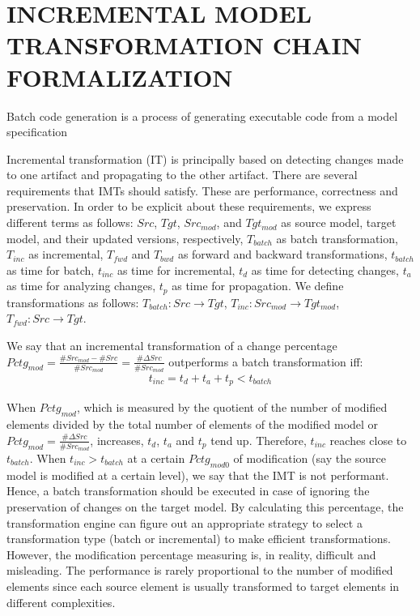 \section{\uppercase{Incremental model transformation chain formalization}}
\begin{definition}
Batch code generation is a process of generating executable code  from a model specification
\end{definition}

Incremental transformation (IT) is principally based on detecting changes made to one artifact and propagating to the other artifact. There are several requirements that IMTs should satisfy. These are performance, correctness and preservation. In order to be explicit about these requirements, we express different terms as follows: $Src$, $Tgt$, $Src_{mod}$, and $Tgt_{mod}$ as source model, target model, and their updated versions, respectively, $T_{batch}$ as batch transformation, $T_{inc}$ as incremental, $T_{fwd}$ and $T_{bwd}$ as forward and backward transformations, $t_{batch}$ as time for batch, $t_{inc}$ as time for incremental, $t_{d}$ as time for detecting changes, $t_{a}$ as time for analyzing changes, $t_{p}$ as time for propagation. We define transformations as follows: $T_{batch}: Src \rightarrow Tgt$, $T_{inc}: Src_{mod} \rightarrow Tgt_{mod}$, $T_{fwd}: Src \rightarrow Tgt$. 

We say that an incremental transformation of a change percentage $Pctg_{mod} = \frac{\# Src_{mod}-\# Src}{\# Src_{mod}} = \frac{\# \Delta Src}{\# Src_{mod}}$ outperforms a batch transformation iff:
\begin{align*}
t_{inc} = t_{d} + t_{a} + t_{p} < t_{batch}
\end{align*} 

When $Pctg_{mod}$, which is measured by the quotient of the number of modified elements divided by the total number of elements of the modified model or $Pctg_{mod} = \frac{\# \Delta Src}{\# Src_{mod}}$, increases, $t_{d}$, $t_{a}$ and $t_{p}$ tend up. Therefore, $t_{inc}$ reaches close to $t_{batch}$. When $t_{inc} > t_{batch}$ at a certain $Pctg_{mod0}$ of modification (say the source model is modified at a certain level), we say that the IMT is not performant. Hence, a batch transformation should be executed in case of ignoring the preservation of changes on the target model. By calculating this percentage, the transformation engine can figure out an appropriate strategy to select a transformation type (batch or incremental) to make efficient transformations. However, the modification percentage measuring is, in reality, difficult and misleading. The performance is rarely proportional to the number of modified elements since each source element is usually transformed to target elements in different complexities. 

